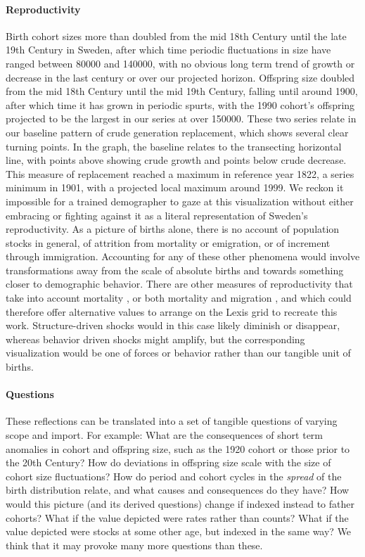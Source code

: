 \paragraph{Reproductivity}
Birth cohort sizes more than doubled from the mid 18th Century until the late 19th Century in Sweden, after which time periodic fluctuations in size have ranged between 80000 and 140000, with no obvious long term trend of growth or decrease in the last century or over our projected horizon. Offspring size doubled from the mid 18th Century until the mid 19th Century, falling until around 1900, after which time it has grown in periodic spurts, with the 1990 cohort's offspring projected to be the largest in our series at over 150000. These two series relate in our baseline pattern of crude generation replacement, which shows several clear turning points. In the graph, the baseline relates to the transecting horizontal line, with points above showing crude growth and points below crude decrease. This measure of replacement reached a maximum in reference year 1822, a series minimum in 1901, with a projected local maximum around 1999. We reckon it impossible for a trained demographer to gaze at this visualization without either embracing or fighting against it as a literal representation of Sweden's reproductivity. As a picture of births alone, there is no account of population stocks in general, of attrition from mortality or emigration, or of increment through immigration. Accounting for any of these other phenomena would involve transformations away from the scale of absolute births and towards something closer to demographic behavior. There are other measures of reproductivity that take into account mortality \citep{kuczynski1932fertility}, or both mortality and migration \citep[][inter alia]{hyrenius1951reproduction,ortega2007birth,preston2007intrinsic,wilson2013migration,ediev2014new}, and which could therefore offer alternative values to arrange on the Lexis grid to recreate this work. Structure-driven shocks would in this case likely diminish or disappear, whereas behavior driven shocks might amplify, but the corresponding visualization would be one of forces or behavior rather than our tangible unit of births. 

\paragraph{Questions}
These reflections can be translated into a set of tangible questions of varying scope and import. For example: What are the consequences of short term anomalies in cohort and offspring size, such as the 1920 cohort or those prior to the 20th Century? How do deviations in offspring size scale with the size of cohort size fluctuations? How do period and cohort cycles in the \emph{spread} of the birth distribution relate, and what causes and consequences do they have? How would this picture (and its derived questions) change if indexed instead to father cohorts? What if the value depicted were rates rather than counts? What if the value depicted were stocks at some other age, but indexed in the same way? We think that it may provoke many more questions than these.
